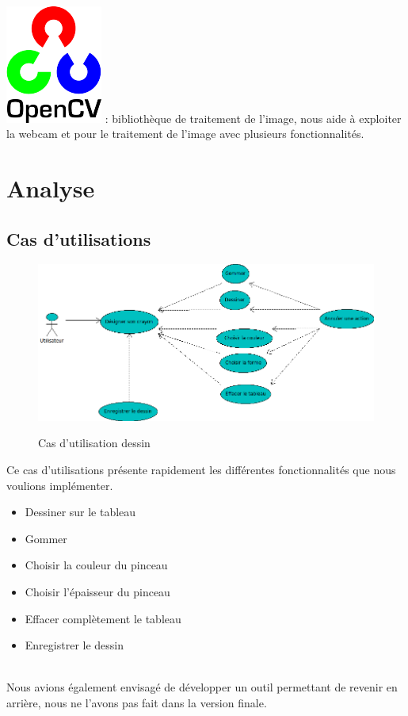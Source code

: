 \documentclass{report}
\begin{document}
			\paragraph{}
			\includegraphics[scale=1]{../logos/OpenCV_Logo.png}
			: bibliothèque de traitement de l'image, nous aide à exploiter la webcam et pour le traitement de l'image avec plusieurs fonctionnalités. \\
		
		\newpage
		\section{Analyse}
			\subsection{Cas d'utilisations}
				\begin{figure}[!h]
						\centering
						\includegraphics[scale=0.6]{../images/Dessin.png}\\
						\caption{Cas d'utilisation dessin}
						\label{Cas d'utilisation}
				\end{figure}
				
				Ce cas d'utilisations présente rapidement les différentes fonctionnalités que nous voulions implémenter.
				\begin{itemize}
				\item Dessiner sur le tableau
				\item Gommer
				\item Choisir la couleur du pinceau
				\item Choisir l'épaisseur du pinceau
				\item Effacer complètement le tableau
				\item Enregistrer le dessin
				\end{itemize}
				\ \\
				Nous avions également envisagé de développer un outil permettant de revenir en arrière, nous ne l'avons pas fait dans la version finale. \\
			\newpage
\end{document}

